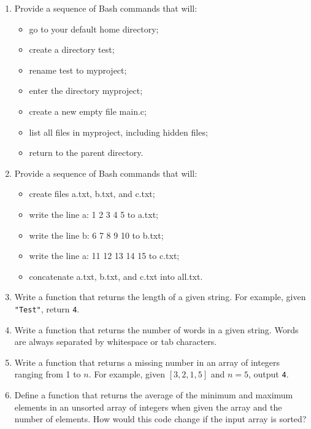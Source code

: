 \documentclass[11pt]{article}
\begin{document}
\begin{enumerate}[leftmargin=*]

\item Provide a sequence of Bash commands that will:
    \begin{itemize}
        \item go to your default home directory;
        \item create a directory test;
        \item rename test to myproject;
        \item enter the directory myproject;
        \item create a new empty file main.c;
        \item list all files in myproject, including hidden files;
        \item return to the parent directory.
    \end{itemize}

\item Provide a sequence of Bash commands that will:
    \begin{itemize}
        \item create files a.txt, b.txt, and c.txt;
        \item write the line a: 1 2 3 4 5 to a.txt;
        \item write the line b: 6 7 8 9 10 to b.txt;
        \item write the line a: 11 12 13 14 15 to c.txt;
        \item concatenate a.txt, b.txt, and c.txt into all.txt.
    \end{itemize}

\item Write a function that returns the length of a given string. For example, given \verb|"Test"|, return \verb|4|.

\item Write a function that returns the number of words in a given string.  Words are always separated by whitespace or tab characters.

\item Write a function that returns a missing number in an array of integers ranging from 1 to $n$. For example, given $[3, 2, 1, 5]$ and $n=5$, output \verb|4|.

\item Define a function that returns the average of the minimum and maximum elements in an unsorted array of integers when given the array and the number of elements. How would this code change if the input array is sorted?


\end{enumerate}
\end{document}
